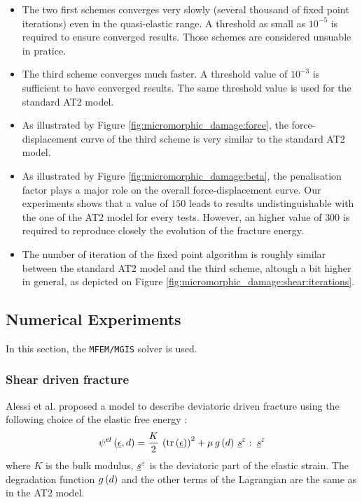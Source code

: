\begin{itemize}
  \item The two first schemes converges very slowly (several thousand of fixed
  point iterations) even in the quasi-elastic range. A threshold as
  small as \(10^{-5}\) is required to ensure converged results. Those
  schemes are considered unsuable in pratice.
  \item The third scheme converges much faster. A threshold value of
  \(10^{-3}\) is sufficient to have converged results. The same
  threshold value is used for the standard AT2 model.
  \item As illustrated by Figure \ref{fig:micromorphic_damage:force}, the
  force-displacement curve of the third scheme is very similar to the
  standard AT2 model.
  \item As illustrated by Figure \ref{fig:micromorphic_damage:beta}, the
  penalisation factor plays a major role on the overall
  force-displacement curve. Our experiments shows that a value of
  \(150\) leads to results undistinguishable with the one of the AT2
  model for every tests. However, an higher value of \(300\) is
  required to reproduce closely the evolution of the fracture energy.
  \item The number of iteration of the fixed point algorithm is roughly
  similar between the standard AT2 model and the third scheme, altough a
  bit higher in general, as depicted on Figure
  \ref{fig:micromorphic_damage:shear:iterations}.
\end{itemize}

\subsection{Numerical Experiments}
\label{sec:micromorphicdamage:numerical_experiments}

In this section, the \texttt{MFEM/MGIS} solver is used.

\subsubsection{Shear driven fracture}

Alessi et al. proposed a model to describe deviatoric driven fracture
using the following choice of the elastic free energy
\cite{alessi_phase-field_2020}:
\[
{\psi}^{el}\left(\underline{\epsilon}, d\right)=
\displaystyle \frac{\displaystyle K}{\displaystyle 2}\,\left(\operatorname{tr}\left(\underline{\epsilon}\right)\right)^{2}+
\mu\,g\left(d\right)\,\underline{s}^{\varepsilon}\,\colon\,\underline{s}^{\varepsilon}
\]
where \(K\) is the bulk modulus, \(\underline{s}^{\varepsilon}\) is the
deviatoric part of the elastic strain. The degradation function
\(g\left(d\right)\) and the other terms of the Lagrangian are the same as in
the AT2 model.

